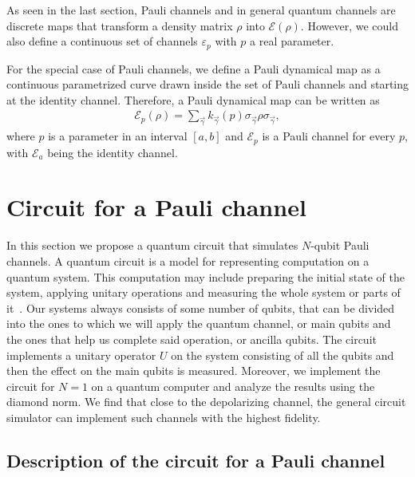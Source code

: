 \documentclass[10pt,letterpaper]{article} %
\begin{document}
As seen in the last section, Pauli channels and in 
general quantum channels are discrete maps
that transform a density matrix $\rho$ into $\mathcal{E}(\rho)$.
However, we could also define a continuous set of 
channels $\varepsilon_p$ with $p$ a real parameter.

For the special case of Pauli channels, we define 
a Pauli dynamical map as a continuous parametrized 
curve drawn inside the set of Pauli channels and starting at the identity channel. 
Therefore, a Pauli dynamical map can be written as
\begin{eqnarray}
\label{eq: Pauli dynamical map}
\mathcal{E}_p(\rho) = \sum_{\vec{\gamma}} k_{\vec{\gamma}}(p) \sigma_{\vec{\gamma}} \rho \sigma_{\vec{\gamma}},
\end{eqnarray}
where $p$ is a parameter in an interval $[a,b]$ 
and $\mathcal{E}_p$ is a Pauli channel for every $p$, 
with $\mathcal{E}_a$ being the identity channel.

\section{Circuit for a Pauli channel} %
\label{sec: Circuit for a Pauli Channel}


In this section we propose a quantum circuit that simulates $N$-qubit Pauli
channels. 
A quantum circuit is a model for representing computation on a quantum system. 
This computation may include preparing the initial state of the system, applying unitary operations and measuring the whole system or parts of it~\cite{Rieffel}.
Our systems always consists of some number of qubits, that can be divided into
the ones to which we will apply the quantum channel, or main qubits
and the ones that help us complete said operation, or ancilla qubits.
The circuit implements a unitary operator $U$ on the system consisting of all
the qubits and then the effect on the main qubits is measured. 
Moreover, we implement the circuit for $N=1$ on a quantum computer
and analyze the results using the diamond norm.
We find that close to the depolarizing channel, the general circuit simulator 
can implement such channels with the highest fidelity.


\subsection{Description of the circuit for a Pauli channel} %
\label{subsec: Description of the circuit}
\end{document}
